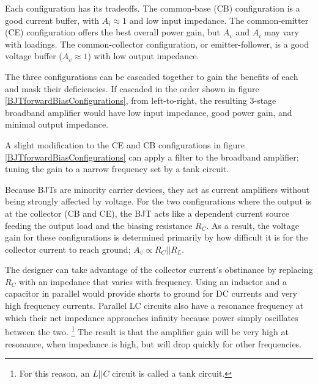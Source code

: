 \documentclass[titlepage, letterpaper, twoside, 10.5pt]{article}
\begin{document}
Each configuration has its tradeoffs. The common-base (CB) configuration is
a good current buffer, with $A_{i}\approx1$ and low input impedance.
The common-emitter (CE) configuration offers the best overall power gain,
but $A_{v}$ and $A_{i}$ may vary with loadings. The common-collector
configuration, or emitter-follower, is a good voltage buffer 
($A_{v}\approx1$) with low output impedance.

The three configurations can be cascaded together to gain the benefits
of each and mask their deficiencies. If cascaded in the order
shown in figure \ref{BJTforwardBiasConfigurations}, from left-to-right,
the resulting 3-stage broadband amplifier would have low input
impedance, good power gain, and minimal output impedance.

A slight modification to the CE and CB configurations in figure
\ref{BJTforwardBiasConfigurations} can apply a filter to the broadband
amplifier; tuning the gain to a narrow frequency set by a tank circuit. 

Because BJTs are minority carrier devices, they act as current amplifiers
without being strongly affected by voltage. For the two configurations
where the output is at the collector (CB and CE), the BJT acts like a
dependent current source feeding the output load and the biasing
resistance $R_{C}$. As a result, the voltage gain for these
configurations is determined primarily by how difficult it is for
the collector current to reach ground; $A_{v}\propto R_{C}||R_{L}$.

The designer can take advantage of the collector current's obstinance
by replacing $R_{C}$ with an impedance that varies with frequency.
Using an inductor and a capacitor in parallel would provide shorts
to ground for DC currents and very high frequency currents. Parallel
LC circuits also have a resonance frequency at which their net 
impedance approaches infinity because power simply oscillates between
the two.
\footnote{For this reason, an $L||C$ circuit is called a tank circuit.}
The result is that the amplifier gain will be very high at resonance,
when impedance is high, but will drop quickly for other frequencies.
\end{document}

